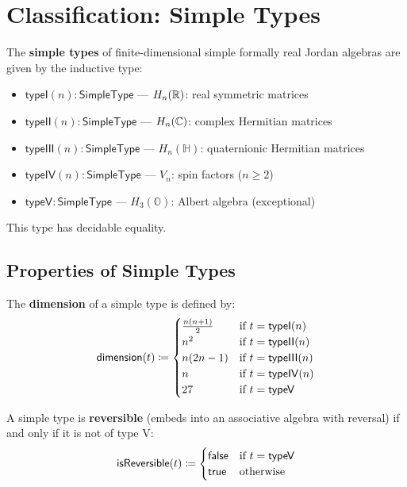 \section{Classification: Simple Types}

\begin{definition}[SimpleType]
The \textbf{simple types} of finite-dimensional simple formally real Jordan algebras are given by the inductive type:
\begin{itemize}
  \item $\mathsf{typeI}(n) : \mathsf{SimpleType}$ --- $H_n(\mathbb{R})$: real symmetric matrices
  \item $\mathsf{typeII}(n) : \mathsf{SimpleType}$ --- $H_n(\mathbb{C})$: complex Hermitian matrices
  \item $\mathsf{typeIII}(n) : \mathsf{SimpleType}$ --- $H_n(\mathbb{H})$: quaternionic Hermitian matrices
  \item $\mathsf{typeIV}(n) : \mathsf{SimpleType}$ --- $V_n$: spin factors ($n \ge 2$)
  \item $\mathsf{typeV} : \mathsf{SimpleType}$ --- $H_3(\mathbb{O})$: Albert algebra (exceptional)
\end{itemize}
This type has decidable equality.
\end{definition}

\subsection{Properties of Simple Types}

\begin{definition}[dimension]
The \textbf{dimension} of a simple type is defined by:
\[
\mathsf{dimension}(t) \coloneqq
\begin{cases}
\frac{n(n+1)}{2} & \text{if } t = \mathsf{typeI}(n) \\
n^2 & \text{if } t = \mathsf{typeII}(n) \\
n(2n-1) & \text{if } t = \mathsf{typeIII}(n) \\
n & \text{if } t = \mathsf{typeIV}(n) \\
27 & \text{if } t = \mathsf{typeV}
\end{cases}
\]
\end{definition}

\begin{definition}[isReversible]
A simple type is \textbf{reversible} (embeds into an associative algebra with reversal) if and only if it is not of type V:
\[
\mathsf{isReversible}(t) \coloneqq
\begin{cases}
\mathsf{false} & \text{if } t = \mathsf{typeV} \\
\mathsf{true} & \text{otherwise}
\end{cases}
\]
\end{definition}

